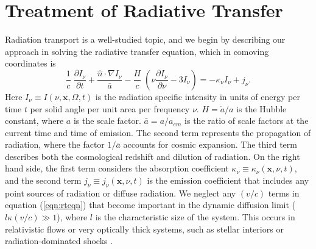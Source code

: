\documentclass[useAMS,usenatbib]{mn2e}
\begin{document}
\section{Treatment of Radiative Transfer}
\label{sec:rt}

Radiation transport is a well-studied topic, and we begin by
describing our approach in solving the radiative transfer equation,
which in comoving coordinates \citep{Gnedin97} is
%
\begin{equation}
  \label{eqn:rteqn}
  \frac{1}{c} \; \frac{\partial I_\nu}{\partial t} + 
  \frac{\hat{n} \cdot \nabla I_\nu}{\bar{a}} -
  \frac{H}{c} \; \left( \nu \frac{\partial I_\nu}{\partial \nu} -
  3 I_\nu \right) = -\kappa_\nu I_\nu + j_\nu .
\end{equation}
%
Here $I_\nu \equiv I(\nu, \mathbf{x}, \Omega, t)$ is the radiation
specific intensity in units of energy per time $t$ per solid angle per
unit area per frequency $\nu$.  $H = \dot{a}/a$ is the Hubble
constant, where $a$ is the scale factor.  $\bar{a} = a/a_{em}$ is the
ratio of scale factors at the current time and time of emission.  The
second term represents the propagation of radiation, where the factor
$1/\bar{a}$ accounts for cosmic expansion.  The third term describes
both the cosmological redshift and dilution of radiation.  On the
right hand side, the first term considers the absorption coefficient
$\kappa_\nu \equiv \kappa_\nu(\mathbf{x},\nu,t)$, and the second term
$j_\nu \equiv j_\nu(\mathbf{x},\nu,t)$ is the emission coefficient
that includes any point sources of radiation or diffuse radiation.  We
neglect any $(v/c)$ terms in equation (\ref{eqn:rteqn}) that become
important in the dynamic diffusion limit ($l \kappa (v/c) \gg 1$),
where $l$ is the characteristic size of the system.  This occurs in
relativistic flows or very optically thick systems, such as stellar
interiors or radiation-dominated shocks \citep[see][for a rigorous
derivation that includes $(v/c)$ terms to
second-order]{Krumholz07_FLD}.
\end{document}
